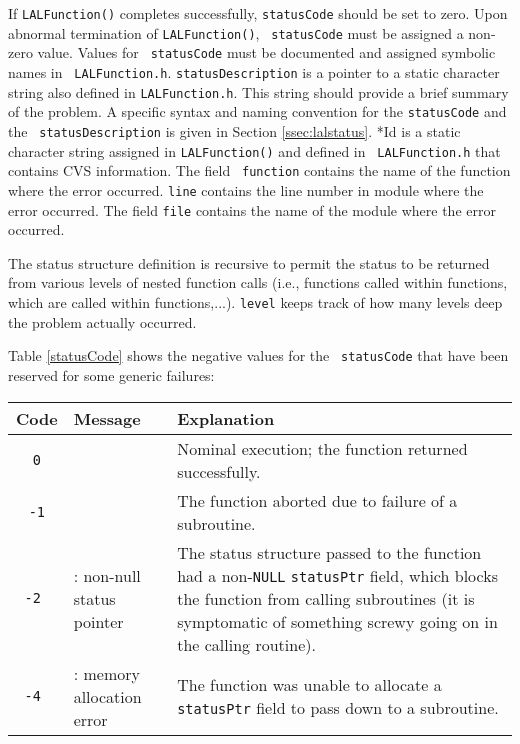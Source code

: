 \documentclass[]{ligodcc}
\begin{document}
\begin{enumerate}
If {\tt LALFunction()} completes successfully, {\tt statusCode} should
be set to zero. Upon abnormal termination of {\tt LALFunction()}, {\tt
statusCode} must be assigned a non-zero value. Values for {\tt
statusCode} must be documented and assigned symbolic names in {\tt
LALFunction.h}. {\tt statusDescription} is a pointer to a static
character string also defined in {\tt LALFunction.h}.  This string
should provide a brief summary of the problem.  A specific syntax and
naming convention for the  {\tt statusCode} and the {\tt
statusDescription} is given in Section \ref{ssec:lalstatus}.  *Id  is a static
character string assigned in {\tt LALFunction()} and defined in {\tt
LALFunction.h} that contains CVS information.  The field {\tt
function}
contains the name of the function  where the error occurred. {\tt line}
contains the line number in module  where the error occurred. The
field {\tt file} contains the name of the module where the error occurred.

The status structure definition is recursive to permit the status to
be returned from various levels of nested function calls (i.e.,
functions called within functions, which are called within
functions,...).  {\tt level} keeps track of how many levels deep the problem
actually occurred.

Table \ref{statusCode} shows the negative values for the {\tt
statusCode} that have been reserved for some generic failures:


\begin{table}
\begin{center}
\begin{tabular}{|cp{4.2cm}p{6.5cm}|}
\hline
Code & Message & Explanation \\
\hline

{\tt 0} & & Nominal execution; the function returned
successfully. \\

{\tt -1} & \vspace{-1.4ex}{\tt Recursive error} & The function aborted due
to failure of a subroutine. \\

\tt -2 & \vspace{-1.4ex}{\tt INITSTATUS}: non-null status pointer & The
status structure passed to the function had a non-{\tt NULL}
{\tt statusPtr} field, which blocks the function from calling
subroutines (it is symptomatic of something screwy going on in the
calling routine). \\

\tt -4 & \vspace{-1.4ex}{\tt ATTATCHSTATUSPTR}: memory allocation error
& The function was unable to allocate a {\tt statusPtr} field to pass
down to a subroutine. \\


\end{tabular}
\end{center}
\end{table}
\end{enumerate}
\end{document}
